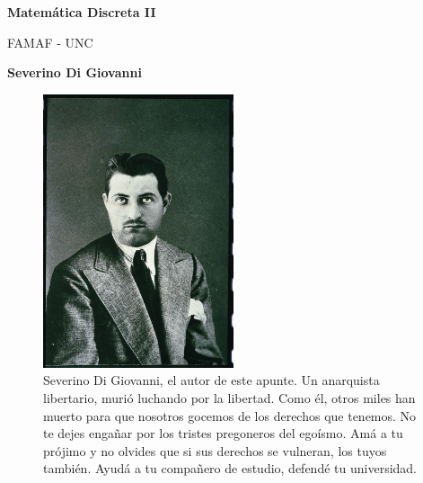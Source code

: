 \documentclass[a4paper]{article}
\begin{document}
    

\begin{titlepage}
   \begin{center}
       \vspace*{1cm}

       \textbf{Matemática Discreta II}

       \small
       \vspace{0.5cm}
        FAMAF - UNC
            
       \vspace{1.5cm}
       \footnotesize
       \textbf{Severino Di Giovanni}
       \normalsize

       \vfill
            
            
     
   \end{center}
\end{titlepage}

 \begin{figure}[h!]
 \centering
  \includegraphics[width=0.5\textwidth]{../Images/SeverinoDiGiovanni.jpg}
 \caption{Severino Di Giovanni, el autor de este apunte. Un anarquista
   libertario, murió luchando por la libertad. Como él, otros miles han muerto
   para que nosotros gocemos de los derechos que tenemos. No te dejes engañar
   por los tristes pregoneros del egoísmo. Amá a tu prójimo y no olvides que si
   sus derechos se vulneran, los tuyos también. Ayudá a tu compañero de estudio,
 defendé tu universidad. }
 \end{figure}

\pagebreak

\tableofcontents
\newpage
\end{document}
